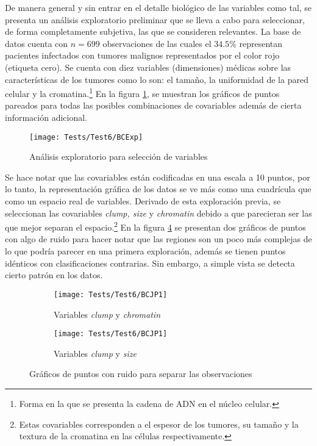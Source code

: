 \documentclass[../Main/Main.tex]{subfiles}
\begin{document}
De manera general y sin entrar en el detalle biológico de las variables como tal, se presenta un análisis exploratorio preliminar que se lleva a cabo para seleccionar, de forma completamente subjetiva, las que se consideren relevantes. La base de datos cuenta con $n = 699$ observaciones de las cuales el $34.5\%$ representan pacientes infectados con tumores malignos representados por el color rojo (etiqueta cero). Se cuenta con diez variables (dimensiones) médicas sobre las características de los tumores como lo son: el tamaño, la uniformidad de la pared celular y la cromatina.\footnote{Forma en la que se presenta la cadena de ADN en el núcleo celular.} En la figura \ref{fig:BCExp}, se muestran los gráficos de puntos pareados para todas las posibles combinaciones de covariables además de cierta información adicional.
\begin{figure}[h]
	\centering
	\texttt{[image: Tests/Test6/BCExp]}
	\caption{Análisis exploratorio para selección de variables}
	\label{fig:BCExp}
\end{figure}
Se hace notar que las covariables están codificadas en una escala a 10 puntos, por lo tanto, la representación gráfica de los datos se ve más como una cuadrícula que como un espacio real de variables. Derivado de esta exploración previa, se seleccionan las covariables \textit{clump, size} y \textit{chromatin} debido a que parecieran ser las que mejor separan el espacio.\footnote{Estas covariables corresponden a el espesor de los tumores, su tamaño y la textura de la cromatina en las células respectivamente.} En la figura \ref{fig:BCJP} se presentan dos gráficos de puntos con algo de ruido para hacer notar que las regiones son un poco más complejas de lo que podría parecer en una primera exploración, además se tienen puntos idénticos con clasificaciones contrarias. Sin embargo, a simple vista se detecta cierto patrón en los datos.
\begin{figure}[h]
        \centering
        \begin{subfigure}[b]{0.45\textwidth}
            \centering
            \texttt{[image: Tests/Test6/BCJP1]}
            \caption{Variables \textit{clump} y \textit{chromatin}}
			\label{fig:BCJP1}
        \end{subfigure}
        \hfill
        \begin{subfigure}[b]{0.45\textwidth}  
            \centering 
            \texttt{[image: Tests/Test6/BCJP1]}
            \caption{Variables \textit{clump} y \textit{size}}
			\label{fig:BCJP2}
        \end{subfigure}
		\caption{Gráficos de puntos con ruido para separar las observaciones}
		\label{fig:BCJP}
\end{figure}
\end{document}
